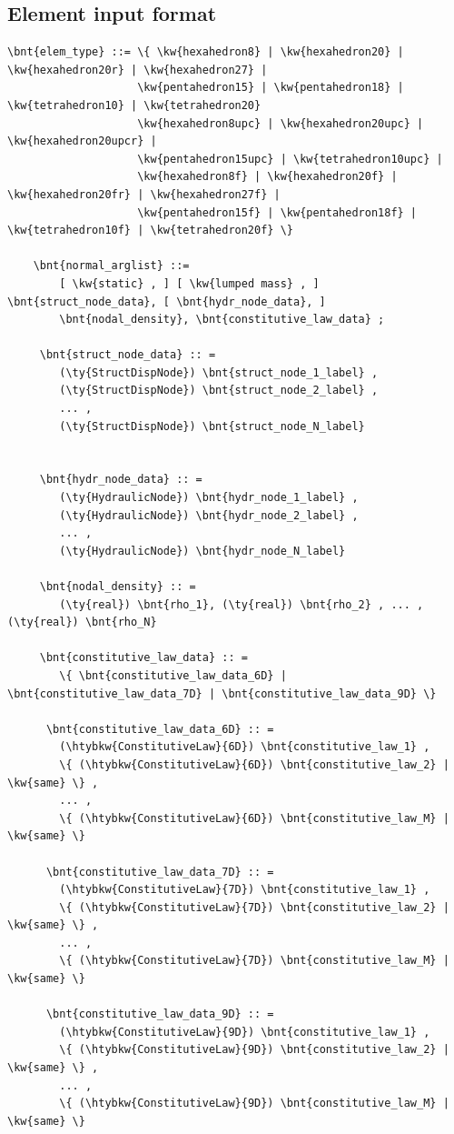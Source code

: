 \subsection{Element input format}
\label{sec:EL:SOLID:INPUT:FORMAT}
\begin{Verbatim}[commandchars=\\\{\}]
  \bnt{elem_type} ::= \{ \kw{hexahedron8} | \kw{hexahedron20} | \kw{hexahedron20r} | \kw{hexahedron27} |
                    \kw{pentahedron15} | \kw{pentahedron18} | \kw{tetrahedron10} | \kw{tetrahedron20}
                    \kw{hexahedron8upc} | \kw{hexahedron20upc} | \kw{hexahedron20upcr} |
                    \kw{pentahedron15upc} | \kw{tetrahedron10upc} |
                    \kw{hexahedron8f} | \kw{hexahedron20f} | \kw{hexahedron20fr} | \kw{hexahedron27f} |
                    \kw{pentahedron15f} | \kw{pentahedron18f} | \kw{tetrahedron10f} | \kw{tetrahedron20f} \}

    \bnt{normal_arglist} ::=
        [ \kw{static} , ] [ \kw{lumped mass} , ] \bnt{struct_node_data}, [ \bnt{hydr_node_data}, ]
        \bnt{nodal_density}, \bnt{constitutive_law_data} ;

     \bnt{struct_node_data} :: =
        (\ty{StructDispNode}) \bnt{struct_node_1_label} ,
        (\ty{StructDispNode}) \bnt{struct_node_2_label} ,
        ... ,
        (\ty{StructDispNode}) \bnt{struct_node_N_label}


     \bnt{hydr_node_data} :: =
        (\ty{HydraulicNode}) \bnt{hydr_node_1_label} ,
        (\ty{HydraulicNode}) \bnt{hydr_node_2_label} ,
        ... ,
        (\ty{HydraulicNode}) \bnt{hydr_node_N_label}

     \bnt{nodal_density} :: =
        (\ty{real}) \bnt{rho_1}, (\ty{real}) \bnt{rho_2} , ... , (\ty{real}) \bnt{rho_N}

     \bnt{constitutive_law_data} :: =
        \{ \bnt{constitutive_law_data_6D} | \bnt{constitutive_law_data_7D} | \bnt{constitutive_law_data_9D} \}

      \bnt{constitutive_law_data_6D} :: =
        (\htybkw{ConstitutiveLaw}{6D}) \bnt{constitutive_law_1} ,
        \{ (\htybkw{ConstitutiveLaw}{6D}) \bnt{constitutive_law_2} | \kw{same} \} ,
        ... ,
        \{ (\htybkw{ConstitutiveLaw}{6D}) \bnt{constitutive_law_M} | \kw{same} \}

      \bnt{constitutive_law_data_7D} :: =
        (\htybkw{ConstitutiveLaw}{7D}) \bnt{constitutive_law_1} ,
        \{ (\htybkw{ConstitutiveLaw}{7D}) \bnt{constitutive_law_2} | \kw{same} \} ,
        ... ,
        \{ (\htybkw{ConstitutiveLaw}{7D}) \bnt{constitutive_law_M} | \kw{same} \}

      \bnt{constitutive_law_data_9D} :: =
        (\htybkw{ConstitutiveLaw}{9D}) \bnt{constitutive_law_1} ,
        \{ (\htybkw{ConstitutiveLaw}{9D}) \bnt{constitutive_law_2} | \kw{same} \} ,
        ... ,
        \{ (\htybkw{ConstitutiveLaw}{9D}) \bnt{constitutive_law_M} | \kw{same} \}
\end{Verbatim}

